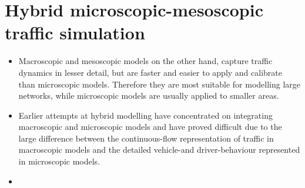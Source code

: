 \documentclass[]{article}
\begin{document}
	\section{Hybrid microscopic-mesoscopic traffic simulation}
	\begin{itemize}
		\item Macroscopic and mesoscopic models on the other hand, capture traffic dynamics in lesser detail, but are faster and easier to apply and calibrate than microscopic models. Therefore they are most suitable for modelling large networks, while microscopic models are usually applied to smaller areas.
		\item Earlier attempts at hybrid modelling have concentrated on integrating macroscopic and microscopic models and have proved difficult due to the large difference between the continuous-flow representation of traffic in macroscopic models and the detailed vehicle-and driver-behaviour represented in microscopic models.
		\item 
	\end{itemize}
	
	


\end{document}
